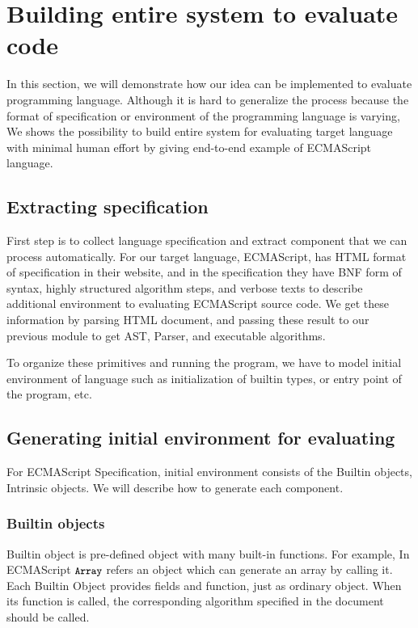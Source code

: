 \section{Building entire system to evaluate code}\label{sec:framework}

In this section, we will demonstrate how our idea can be implemented to evaluate programming language. Although it is hard to generalize the process because the format of specification or 
environment of the programming language is varying, We shows the possibility to build entire system for evaluating target language with minimal human effort by giving end-to-end example of ECMAScript language.

\subsection{Extracting specification}
First step is to collect language specification and extract component that we can process automatically. For our target language, ECMAScript, has HTML format of specification in their website, and
in the specification they have BNF form of syntax, highly structured algorithm steps, and verbose texts to describe additional environment to evaluating ECMAScript source code.
We get these information by parsing HTML document, and passing these result to our previous module to get AST, Parser, and executable algorithms.

To organize these primitives and running the program, we have to model initial environment of language such as initialization of builtin types, or entry point of the program, etc.

\subsection{Generating initial environment for evaluating}
For ECMAScript Specification, initial environment consists of the Builtin objects, Intrinsic objects. We will describe how to generate each component.

\subsubsection{Builtin objects}

 Builtin object is pre-defined object with many built-in functions. For example, In ECMAScript \( \texttt{\small Array} \) refers an object which can generate an array by
 calling it. Each Builtin Object provides fields and function, just as ordinary object. When its function is called,
 the corresponding algorithm specified in the document should be called. 
 
